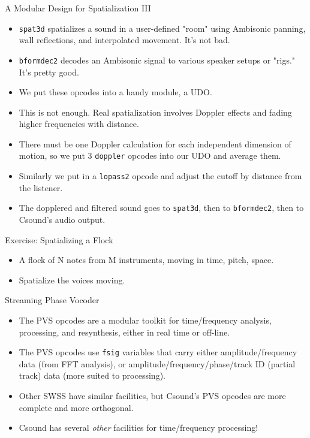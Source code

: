 \documentclass{beamer}
\begin{document}
    \begin{frame}{A Modular Design for Spatialization III}
        \begin{itemize}
            \item \texttt{spat3d} spatializes a sound in a user-defined "room" using Ambisonic panning, wall reflections, and interpolated movement. It's not bad. 
            \item \texttt{bformdec2} decodes an Ambisonic signal to various speaker setups or "rigs." It's pretty good.
            \item We put these opcodes into a handy module, a UDO.
            \item This is not enough. Real spatialization involves Doppler effects and fading higher frequencies with distance.
            \item There must be one Doppler calculation for each independent dimension of motion, so we put 3 \texttt{doppler} opcodes into our UDO and average them.
            \item Similarly we put in a \texttt{lopass2} opcode and adjust the cutoff by distance from the listener.
            \item The dopplered and filtered sound goes to \texttt{spat3d}, then to \texttt{bformdec2}, then to Csound's audio output.
        \end{itemize}
    \end{frame}

    \begin{frame}{Exercise: Spatializing a Flock}
        \begin{itemize}
            \item A flock of N notes from M instruments, moving in {time, pitch,
                space}.
            \item Spatialize the voices moving.
        \end{itemize}
    \end{frame}
    
    \begin{frame}{Streaming Phase Vocoder}
        \begin{itemize}
            \item The PVS opcodes are a modular toolkit for time/frequency analysis, processing, and resynthesis, either in real time or off-line.
            \item The PVS opcodes use \texttt{fsig} variables that carry either amplitude/frequency data (from FFT analysis), or amplitude/frequency/phase/track ID (partial track) data (more suited to processing).
            \item Other SWSS have similar facilities, but Csound's PVS opcodes are more complete and more orthogonal.
            \item Csound has several \textit{other} facilities for time/frequency processing!
        \end{itemize}
    \end{frame}
        
\end{document}
